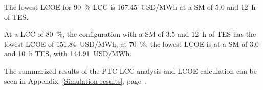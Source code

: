 The lowest \ac{LCOE} for \SI{90}{\percent} \ac{LCC} is \SI{167.45}{USD/MWh} at a \ac{SM} of \num{5.0} and \SI{12}{h} of \ac{TES}.


At a \ac{LCC} of \SI{80}{\percent}, the configuration with a \ac{SM} of \num{3.5} and \SI{12}{h} of \ac{TES} has the lowest \ac{LCOE} of \SI{151.84}{USD/MWh}, at \SI{70}{\percent}, the lowest \ac{LCOE} is at a \ac{SM} of \num{3.0} and \SI{10}{h} \ac{TES}, with \SI{144.91}{USD/MWh}.

The summarized results of the \ac{PTC} \ac{LCC} analysis and \ac{LCOE} calculation can be seen in Appendix~\ref{Simulation results}, page~\pageref{tbl: PTC_results}.
